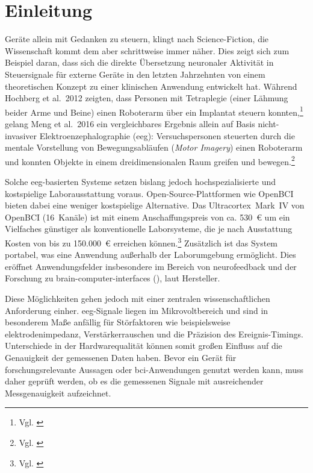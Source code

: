 
 
\chapter{Einleitung}
Geräte allein mit Gedanken zu steuern, klingt nach Science-Fiction, die Wissenschaft kommt dem aber schrittweise immer näher. Dies zeigt sich zum Beispiel daran, dass sich die direkte Übersetzung neuronaler Aktivität in Steuersignale für externe Geräte in den letzten Jahrzehnten von einem theoretischen Konzept zu einer klinischen Anwendung entwickelt hat. Während Hochberg et al.\ 2012 zeigten, dass Personen mit Tetraplegie (einer Lähmung beider Arme und Beine) einen Roboterarm über ein  Implantat steuern konnten,\footnote{Vgl. \cite[S.~373]{hochberg2012_roboticarm}} gelang Meng et al.\ 2016 ein vergleichbares Ergebnis allein auf Basis nicht-invasiver Elektroenzephalographie (\acrshort{eeg}): Versuchspersonen steuerten durch die mentale Vorstellung von Bewegungsabläufen (\textit{Motor Imagery}) einen Roboterarm und konnten Objekte in einem dreidimensionalen Raum greifen und bewegen.\footnote{Vgl. \cite[S.~9]{meng2016_eeg_roboticarm}}

Solche \acrshort{eeg}-basierten Systeme setzen bislang jedoch hochspezialisierte und kostspielige Laborausstattung voraus. Open-Source-Plattformen wie OpenBCI bieten dabei eine weniger kostspielige Alternative. Das Ultracortex~Mark~IV von OpenBCI (16~Kanäle) ist mit einem Anschaffungspreis von ca. 530~€ um ein Vielfaches günstiger als konventionelle Laborsysteme, die je nach Ausstattung Kosten von bis zu 150.000~€ erreichen können.\footnote{Vgl. \cite{openbci_ultracortex_shop, kappenman2018_eeg_lab}} Zusätzlich ist das System portabel, was eine Anwendung außerhalb der Laborumgebung ermöglicht. Dies eröffnet Anwendungsfelder insbesondere im Bereich von \gls{neurofeedback} und der Forschung zu \glspl{brain-computer-interface} (), laut Hersteller.

Diese Möglichkeiten gehen jedoch mit einer zentralen wissenschaftlichen Anforderung einher. \acrshort{eeg}-Signale liegen im Mikrovoltbereich und sind in besonderem Maße anfällig für Störfaktoren wie beispielsweise \gls{elektrodenimpedanz}, Verstärkerrauschen und die Präzision des Ereignis-Timings. Unterschiede in der Hardwarequalität können somit großen Einfluss auf die Genauigkeit der gemessenen Daten haben. Bevor ein Gerät für forschungsrelevante Aussagen oder \acrshort{bci}-Anwendungen genutzt werden kann, muss daher geprüft werden, ob es die gemessenen Signale mit ausreichender Messgenauigkeit aufzeichnet.

